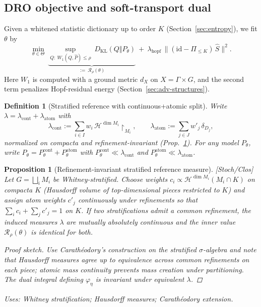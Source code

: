 \documentclass[10pt]{article}
\newcommand{\uses}[1]{\par\smallskip\noindent\textit{Uses: }#1\par\smallskip}
\newenvironment{proofsketch}{\begin{proof}[Proof sketch]}{\end{proof}}
\newcommand{\cont}{{\mathrm{cont}}}
\newcommand{\atom}{{\mathrm{atom}}}
\newtheorem{definition}{Definition}
\newtheorem{proposition}{Proposition}
\begin{document}
\subsection{DRO objective and soft-transport dual}

Given a whitened statistic dictionary up to order $K$ (Section~\ref{sec:entropy}), we fit $\theta$ by
\begin{equation}\label{eq:DRO}
\min_{\theta\in\Theta}\ \underbrace{\sup_{Q:\ W_1(Q,\hat P)\le \rho}\ D_{\mathrm{KL}}(Q\Vert P_\theta)}_{:=\ \mathcal R_\rho(\theta)}\ +\ \lambda_{\mathrm{hopf}}\,\big\|(\mathrm{id}-\Pi_{\le K})\,\hat S\big\|^2.
\end{equation}
Here $W_1$ is computed with a ground metric $d_X$ on $X=\Gamma\times G$, and the second term penalizes Hopf-residual energy (Section~\ref{sec:adv-structures}).

\begin{definition}[Stratified reference with continuous+atomic split]\label{def:ref-measure}
Write $\lambda=\lambda_{\cont}+\lambda_{\atom}$ with
\[
\lambda_{\cont}:=\sum_{i\in I} w_i\,\mathcal H^{\dim M_i}\!\!\restriction_{M_i},\qquad
\lambda_{\atom}:=\sum_{j\in J} w'_j\,\delta_{D_j},
\]
normalized on compacta and refinement-invariant (Prop.~\ref{prop:lambda-refinement}). 
For any model $P_\theta$, write $P_\theta=P^{\cont}_\theta+P^{\atom}_\theta$ with $P^{\cont}_\theta\ll\lambda_{\cont}$ and $P^{\atom}_\theta\ll\lambda_{\atom}$.
\end{definition}

\begin{proposition}[Refinement-invariant stratified reference measure]\label{prop:lambda-refinement}
\emph{[\textup{Stoch/Clos}]}
Let $G=\bigsqcup_i M_i$ be Whitney-stratified. Choose weights $c_i \propto \mathcal H^{\dim M_i}(M_i\cap K)$ on compacta $K$ (Hausdorff volume of top-dimensional pieces restricted to $K$) and assign atom weights $c'_j$ continuously under refinements so that $\sum_i c_i+\sum_j c'_j=1$ on $K$. 
If two stratifications admit a common refinement, the induced measures $\lambda$ are mutually absolutely continuous and the inner value $\mathcal R_\rho(\theta)$ is identical for both. 
\begin{proofsketch}
Use Carathéodory’s construction on the stratified $\sigma$-algebra and note that Hausdorff measures agree up to equivalence across common refinements on each piece; atomic mass continuity prevents mass creation under partitioning. The dual integral defining $\varphi_\eta$ is invariant under equivalent $\lambda$.
\end{proofsketch}
\uses{Whitney stratification; Hausdorff measures; Carathéodory extension.}
\end{proposition}
\end{document}
